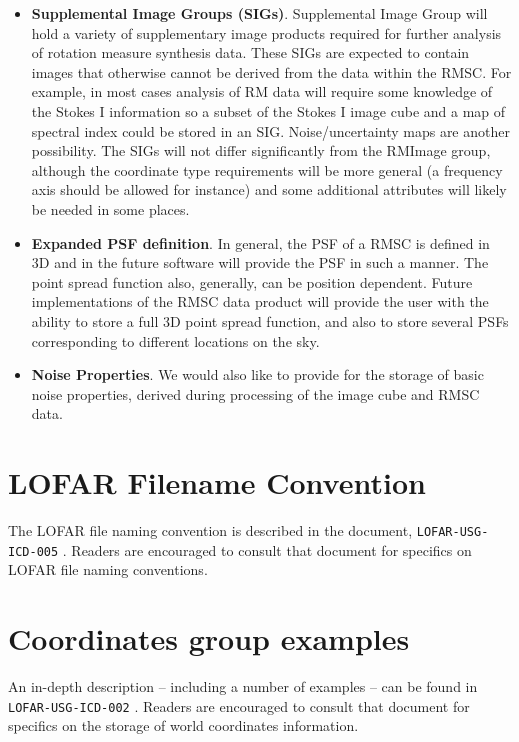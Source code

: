 \documentclass[a4paper,10pt,bibtotoc]{scrartcl}
\begin{document}
\begin{itemize}
	\item \textbf{Supplemental Image Groups (SIGs)}.  Supplemental Image Group will hold a variety of supplementary image products required for further analysis of rotation measure synthesis data.  These SIGs are expected to contain images that otherwise cannot be derived from the data within the RMSC. For example, in most cases analysis of RM data will require some knowledge of the Stokes I information so a subset of the Stokes I image cube and a map of spectral index could be stored in an SIG.  Noise/uncertainty maps are another possibility.  The SIGs will not differ significantly from the RMImage group, although the coordinate type requirements will be more general (a frequency axis should be allowed for instance) and some additional attributes will likely be needed in some places.
	
	\item \textbf{Expanded PSF definition}.  In general, the PSF of a RMSC is defined in 3D and in the future software will provide the PSF in such a manner.  The point spread function also, generally, can be position dependent.  Future implementations of the RMSC data product will provide the user with the ability to store a full 3D point spread function, and also to store several PSFs corresponding to different locations on the sky.  
	
	\item \textbf{Noise Properties}. We would also like to provide for the storage of basic noise properties, derived during processing of the image cube and RMSC data.  
	
\end{itemize}

\section{LOFAR Filename Convention}
\label{sec:filenames}

The LOFAR file naming convention is described in the document, \texttt{LOFAR-USG-ICD-005} \cite{lofar.icd.005}. Readers are encouraged to consult that document for specifics on LOFAR file naming conventions.

\section{Coordinates group examples}
\label{sec:coordinate examples}

An in-depth description -- including a number of examples -- can be
found in \texttt{LOFAR-USG-ICD-002} \cite{lofar.icd.002}. Readers are encouraged to consult that document for specifics on the storage of world coordinates information. 
\end{document}

